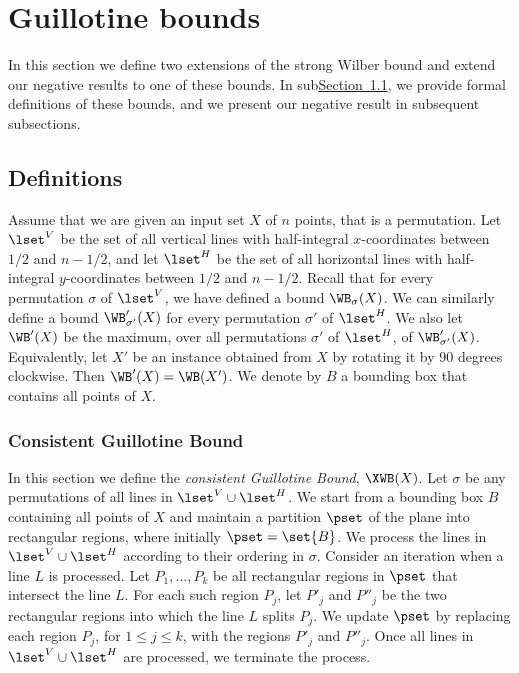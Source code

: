 \documentclass[11pt]{article}
\numberwithin{equation}{section}
\theoremstyle{definition}
\theoremstyle{plain}
\newcommand{\expref}[2]{\hyperref[#2]{#1~\ref{#2}}}
\begin{document}
%

%

%

%
%
%
%
\section{Guillotine bounds}\label{sec: extension to extended}
%
%
%
%

In this section we define two extensions of the strong Wilber bound and extend our negative results to  one of these bounds.
%
In sub\expref{Section}{subsec: defs}, we provide formal definitions of these bounds, and we present our negative result in subsequent subsections.  
 
\subsection{Definitions} 
\label{subsec: defs} 


Assume that we are given an input set $X$ of $n$ points, that is a permutation. Let $\lset^V$ be the set of all vertical lines with half-integral $x$-coordinates between $1/2$ and $n-1/2$, and let $\lset^H$ be the set of all horizontal lines with half-integral $y$-coordinates between $1/2$ and $n-1/2$. Recall that for every permutation $\sigma$ of $\lset^V$, we have defined a bound $\WB_{\sigma}(X)$. We can similarly define a bound $\WB'_{\sigma'}(X)$ for every permutation $\sigma'$ of $\lset^H$. We also let $\WB'(X)$ be the maximum, over all permutations $\sigma'$ of $\lset^H$, of $\WB'_{\sigma'}(X)$. Equivalently, let $X'$ be an instance obtained from $X$ by rotating it by $90$ degrees clockwise. Then $\WB'(X)=\WB(X')$. We denote by $B$ a bounding box that contains all points of $X$.

\subsubsection{Consistent Guillotine Bound}


In this section we define the \emph{consistent Guillotine Bound}, $\XWB(X)$. Let $\sigma$ be any permutations of all lines in $\lset^V\cup \lset^H$. 
We start from a bounding box $B$ containing all points of $X$ and maintain a partition $\pset$ of the plane into rectangular regions, where initially $\pset = \set{B}$.  
We process the lines in $\lset^V \cup \lset^H$ according to their ordering in $\sigma$. 
Consider an iteration when a line $L$ is processed. Let $P_1,\ldots, P_k$ be all rectangular regions in $\pset$ that intersect the line $L$. For each such region $P_j$, let $P'_j$ and $P''_j$ be the two rectangular regions into which the line $L$ splits $P_j$. 
We update $\pset$ by replacing each region $P_j$, for $1\leq j\leq k$, with the regions $P'_j$ and $P''_j$. 
Once all lines in $\lset^V\cup \lset^H$ are processed, we terminate the process.
\end{document}
